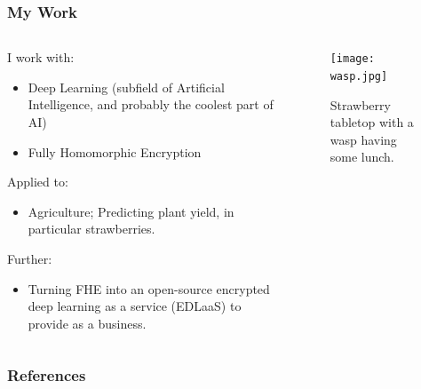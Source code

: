 \documentclass[aspectratio=169]{beamer}
\begin{document}
  \begin{frame}
    \frametitle{My Work}
    \begin{columns}
      \begin{column}{0.5\textwidth}
        I work with:
        \begin{itemize}
          \item Deep Learning (subfield of Artificial Intelligence, and probably the coolest part of AI)
          \item Fully Homomorphic Encryption
        \end{itemize}
        Applied to:
        \begin{itemize}
          \item Agriculture; Predicting plant yield, in particular strawberries.
        \end{itemize}
        Further:
        \begin{itemize}
          \item Turning FHE into an open-source encrypted deep learning as a service (EDLaaS) to provide as a business.
        \end{itemize}
      \end{column}
      \begin{column}{0.5\textwidth}
        \begin{figure}[th!]
          \centering
          \texttt{[image: wasp.jpg]}
          \caption{Strawberry tabletop with a wasp having some lunch. \autocite{repository}}
          \label{fig:wasp}
        \end{figure}
      \end{column}
    \end{columns}
  \end{frame}

  \begin{frame}[allowframebreaks]
    \frametitle{References}
    \printbibliography
  \end{frame}
\end{document}
